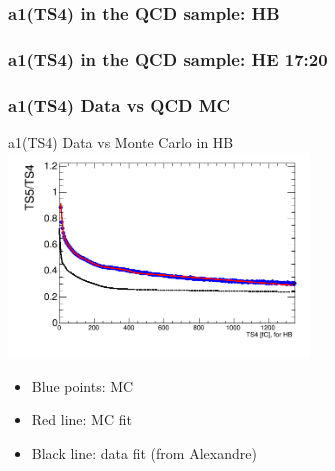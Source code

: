 \documentclass[bigger]{beamer}
\begin{document}
\begin{frame}
\frametitle{a1(TS4) in the QCD sample: HB}
\label{sec-3-4-2}
\label{sec-3-4-2-1}

\begin{center}
\resizebox*{!}{0.75\textheight}{

}
\end{center}
\end{frame}
\begin{frame}
\frametitle{a1(TS4) in the QCD sample: HE 17:20}
\label{sec-3-4-3}
\label{sec-3-4-3-1}

\begin{center}
\resizebox*{!}{0.75\textheight}{

}
\end{center}
\end{frame}
\begin{frame}
\frametitle{a1(TS4) Data vs QCD MC}
\label{sec-3-4-4}
\label{sec-3-4-4-1}

\centering
a1(TS4) Data vs Monte Carlo in HB
\includegraphics[width=0.6\textwidth]{fig/a1_ring0_daata.png}
\label{sec-3-4-4-2}
\begin{itemize}

\item Blue points: MC
\label{sec-3-4-4-2-1}%

\item Red line: MC fit
\label{sec-3-4-4-2-2}%

\item Black line: data fit (from Alexandre)
\label{sec-3-4-4-2-3}%
\end{itemize} %
\end{frame}
\end{document}
